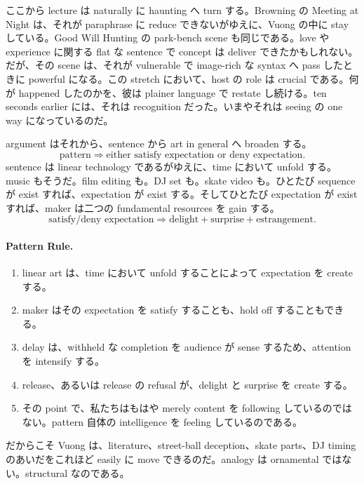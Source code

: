 ここから lecture は naturally に haunting へ turn する。Browning の Meeting at Night は、それが paraphrase に reduce できないがゆえに、Vuong の中に stay している。Good Will Hunting の park-bench scene も同じである。love や experience に関する flat な sentence で concept は deliver できたかもしれない。だが、その scene は、それが vulnerable で image-rich な syntax へ pass したときに powerful になる。この stretch において、host の role は crucial である。何が happened したのかを、彼は plainer language で restate し続ける。ten seconds earlier には、それは recognition だった。いまやそれは seeing の one way になっているのだ。

argument はそれから、sentence から art in general へ broaden する。
\begin{equation}
\text{pattern} \Longrightarrow \text{either satisfy expectation or deny expectation}.
\end{equation}
sentence は linear technology であるがゆえに、time において unfold する。music もそうだ。film editing も。DJ set も。skate video も。ひとたび sequence が exist すれば、expectation が exist する。そしてひとたび expectation が exist すれば、maker は二つの fundamental resources を gain する。
\begin{equation}
\text{satisfy/deny expectation} \Longrightarrow \text{delight} + \text{surprise} + \text{estrangement}.
\end{equation}

\paragraph{Pattern Rule.}
\begin{enumerate}
\item linear art は、time において unfold することによって expectation を create する。
\item maker はその expectation を satisfy することも、hold off することもできる。
\item delay は、withheld な completion を audience が sense するため、attention を intensify する。
\item release、あるいは release の refusal が、delight と surprise を create する。
\item その point で、私たちはもはや merely content を following しているのではない。pattern 自体の intelligence を feeling しているのである。
\end{enumerate}

だからこそ Vuong は、literature、street-ball deception、skate parts、DJ timing のあいだをこれほど easily に move できるのだ。analogy は ornamental ではない。structural なのである。


